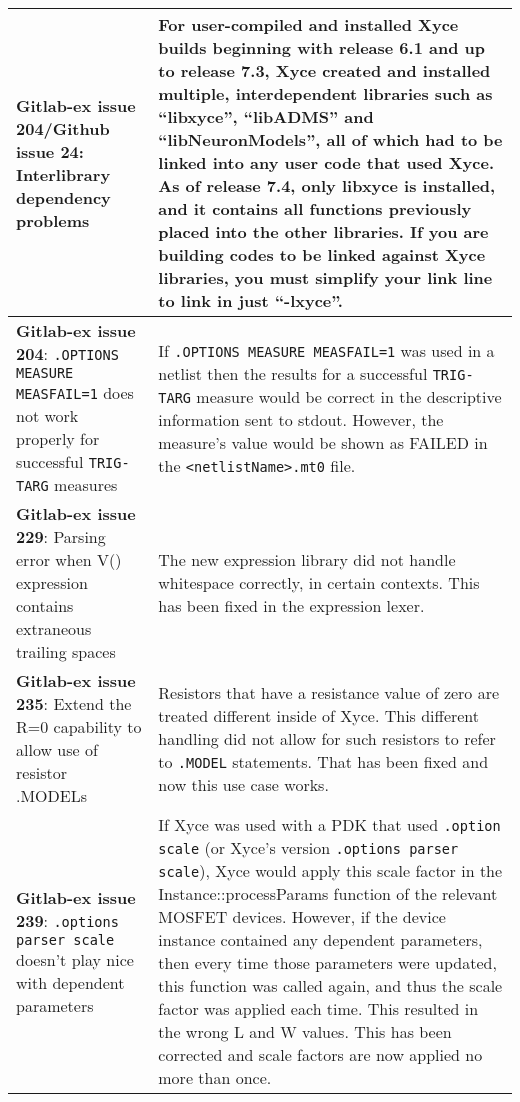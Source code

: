 {\begin{longtable}[h] {>{\raggedright\small}m{2in}|>{\raggedright\let\\\tabularnewline\small}m{3.5in}}
\textbf{Gitlab-ex issue 204/Github issue 24}: Interlibrary dependency problems &
For user-compiled and installed Xyce builds beginning with release 6.1
and up to release 7.3, Xyce created and installed multiple,
interdependent libraries such as ``libxyce'', ``libADMS'' and
``libNeuronModels'', all of which had to be linked into any user code
that used Xyce.  As of release 7.4, only libxyce is installed, and it
contains all functions previously placed into the other libraries.  If
you are building codes to be linked against Xyce libraries, you must
simplify your link line to link in just ``-lxyce''.\\ \hline

  \textbf{Gitlab-ex issue 204}: \texttt{.OPTIONS MEASURE MEASFAIL=1}
does not work properly for successful \texttt{TRIG-TARG} measures &
If \texttt{.OPTIONS MEASURE MEASFAIL=1} was used in a netlist then the
results for a successful \texttt{TRIG-TARG} measure would be correct
in the descriptive information sent to stdout.  However, the measure's
value would be shown as FAILED in the \texttt{<netlistName>.mt0}
file. \\ \hline

  \textbf{Gitlab-ex issue 229}: Parsing error when V() expression
contains extraneous trailing spaces & The new expression library did
not handle whitespace correctly, in certain contexts.  This has been
fixed in the expression lexer.  \\ \hline

  \textbf{Gitlab-ex issue 235}: Extend the R=0 capability to allow use
of resistor .MODELs & Resistors that have a resistance value of zero
are treated different inside of Xyce.  This different handling did not
allow for such resistors to refer to \texttt{.MODEL} statements.  That
has been fixed and now this use case works.  \\ \hline

  \textbf{Gitlab-ex issue 239}: \texttt{.options parser scale} doesn't
play nice with dependent parameters & If Xyce was used with a PDK that
used \texttt{.option scale} (or Xyce's version \texttt{.options parser
scale}), Xyce would apply this scale factor in the
Instance::processParams function of the relevant MOSFET devices.
However, if the device instance contained any dependent parameters,
then every time those parameters were updated, this function was
called again, and thus the scale factor was applied each time. This
resulted in the wrong L and W values.  This has been corrected and
scale factors are now applied no more than once.  \\ \hline


\end{longtable}}
